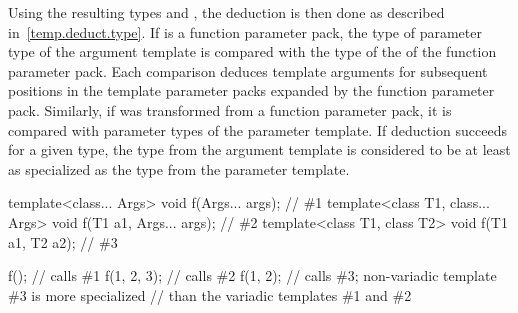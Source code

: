 \documentclass{wg21}
\begin{document}
\pnum
Using the resulting types
and
,
the deduction is then done as described in~\ref{temp.deduct.type}.
If  is a function parameter pack, the type  of 
parameter type of the argument template is compared with the type  of
the  of the function parameter pack. Each comparison
deduces template arguments for subsequent positions in the template parameter
packs expanded by the function parameter pack.
Similarly, if  was transformed from a function parameter pack,
it is compared with  parameter types of the parameter template.
If deduction succeeds for a given type,
the type from the argument template is considered to be at least as specialized
as the type from the parameter template.
\begin{example}
    \begin{codeblock}
    template<class... Args>           void f(Args... args);         // \#1
    template<class T1, class... Args> void f(T1 a1, Args... args);  // \#2
    template<class T1, class T2>      void f(T1 a1, T2 a2);         // \#3

    f();                // calls \#1
    f(1, 2, 3);         // calls \#2
    f(1, 2);            // calls \#3; non-variadic template \#3 is more specialized
    // than the variadic templates \#1 and \#2
    \end{codeblock}
\end{example}


%
%
%
\end{document}
